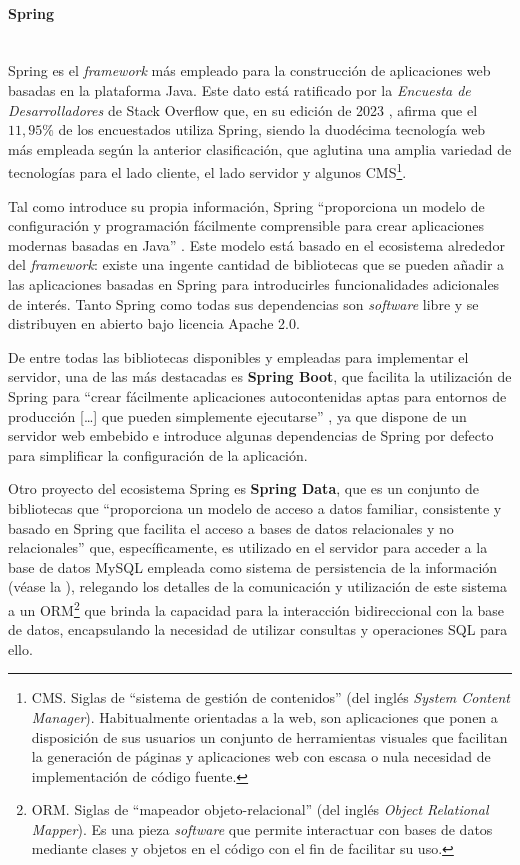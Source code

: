 \paragraph{Spring}\mbox{} \\
Spring es el \textit{framework} más empleado para la construcción de aplicaciones web basadas en la plataforma Java. Este dato está ratificado por la \textit{Encuesta de Desarrolladores} de Stack Overflow que, en su edición de 2023 \cite{subsec:tecAppAngularSurvey}, afirma que el $11,95\%$ de los encuestados utiliza Spring, siendo la duodécima tecnología web más empleada según la anterior clasificación, que aglutina una amplia variedad de tecnologías para el lado cliente, el lado servidor y algunos CMS\footnote{CMS. Siglas de ``sistema de gestión de contenidos'' (del inglés \textit{System Content Manager}). Habitualmente orientadas a la web, son aplicaciones que ponen a disposición de sus usuarios un conjunto de herramientas visuales que facilitan la generación de páginas y aplicaciones web con escasa o nula necesidad de implementación de código fuente.}.

Tal como introduce su propia información, Spring ``proporciona un modelo de configuración y programación fácilmente comprensible para crear aplicaciones modernas basadas en Java'' \cite{SpringFramework}. Este modelo está basado en el ecosistema alrededor del \textit{framework}: existe una ingente cantidad de bibliotecas que se pueden añadir a las aplicaciones basadas en Spring para introducirles funcionalidades adicionales de interés. Tanto Spring como todas sus dependencias son \textit{software} libre y se distribuyen en abierto bajo licencia Apache 2.0.

De entre todas las bibliotecas disponibles y empleadas para implementar el servidor, una de las más destacadas es \textbf{Spring Boot}, que facilita la utilización de Spring para ``crear fácilmente aplicaciones autocontenidas aptas para entornos de producción [\dots] que pueden simplemente ejecutarse'' \cite{SpringBoot}, ya que dispone de un servidor web embebido e introduce algunas dependencias de Spring por defecto para simplificar la configuración de la aplicación.

Otro proyecto del ecosistema Spring es \textbf{Spring Data}, que es un conjunto de bibliotecas que ``proporciona un modelo de acceso a datos familiar, consistente y basado en Spring que facilita el acceso a bases de datos relacionales y no relacionales'' \cite{SpringData} que, específicamente, es utilizado en el servidor para acceder a la base de datos MySQL empleada como sistema de persistencia de la información (véase la ), relegando los detalles de la comunicación y utilización de este sistema a un ORM\footnote{ORM. Siglas de ``mapeador objeto-relacional'' (del inglés \textit{Object Relational Mapper}). Es una pieza \textit{software} que permite interactuar con bases de datos mediante clases y objetos en el código con el fin de facilitar su uso.} que brinda la capacidad para la interacción bidireccional con la base de datos, encapsulando la necesidad de utilizar consultas y operaciones SQL para ello.

